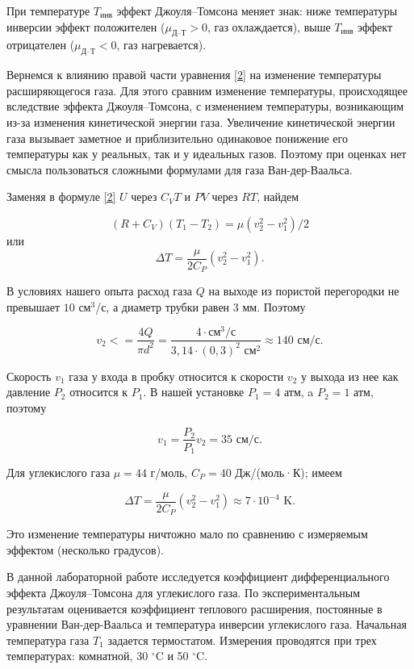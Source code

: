 \documentclass[12pt,a4paper]{article}
\begin{document}
При температуре $ T_\text{инв} $ эффект Джоуля–Томсона меняет знак: ниже температуры инверсии эффект положителен ($ \mu_\text{Д--Т} > 0 $, газ охлаждается), выше $ T_\text{инв} $ эффект отрицателен ($ \mu_\text{Д--Т} < 0 $, газ нагревается).

Вернемся к влиянию правой части уравнения \eqref{2} на изменение температуры расширяющегося газа. Для этого сравним изменение температуры, происходящее вследствие эффекта Джоуля–Томсона, с изменением температуры, возникающим из-за изменения кинетической энергии газа. Увеличение кинетической энергии газа вызывает заметное и приблизительно одинаковое понижение его температуры как у реальных, так и у идеальных газов. Поэтому при оценках нет смысла пользоваться сложными формулами для газа Ван-дер-Ваальса.

Заменяя в формуле \eqref{2} $ U $ через $ C_VT $ и $ PV $ через $ RT $, найдем

\[ \left(R+C_V\right)\left(T_1-T_2\right)=\mu\left(v_2^2-v_1^2\right)/2 \]
или
\[ \Delta T = \frac{\mu}{2C_P}\left(v_2^2-v_1^2\right). \]

В условиях нашего опыта расход газа $ Q  $ на выходе из пористой перегородки не превышает $ 10 $ см$ ^3 $/с, а диаметр трубки равен 3 мм. Поэтому

\[ v_2<=\frac{4Q}{\pi d^2} = \frac{4\cdot\text{см}^3/\text{с}}{3,14\cdot(0,3)^2\text{ см}^2} \approx 140 \text{ см}/\text{с}. \]

Скорость $ v_1 $ газа у входа в пробку относится к скорости $ v_2 $ у выхода из нее как давление $ P_2 $ относится к $ P_1 $. В нашей установке $ P_1 = 4 $ атм, a $ P_2 = 1 $ атм, поэтому

\[ v_1=\frac{P_2}{P_1}v_2 = 35 \text{ см}/\text{с}. \]

Для углекислого газа $ \mu = 44 $ г/моль, $ C_P = 40 $ Дж/(моль·К); имеем

\[ \Delta T = \frac{\mu}{2C_P}\left(v_2^2-v_1^2\right) \approx 7\cdot10^{-4} \text{ K}. \]

Это изменение температуры ничтожно мало по сравнению с измеряемым эффектом (несколько градусов).

В данной лабораторной работе исследуется коэффициент дифференциального эффекта Джоуля–Томсона для углекислого газа. По экспериментальным результатам оценивается коэффициент теплового расширения, постоянные в уравнении Ван-дер-Ваальса и температура инверсии углекислого газа. Начальная температура газа $ T_1 $ задается термостатом. Измерения проводятся при трех температурах: комнатной, 30 $ ^\circ $C и 50 $ ^\circ $C.
\end{document}
